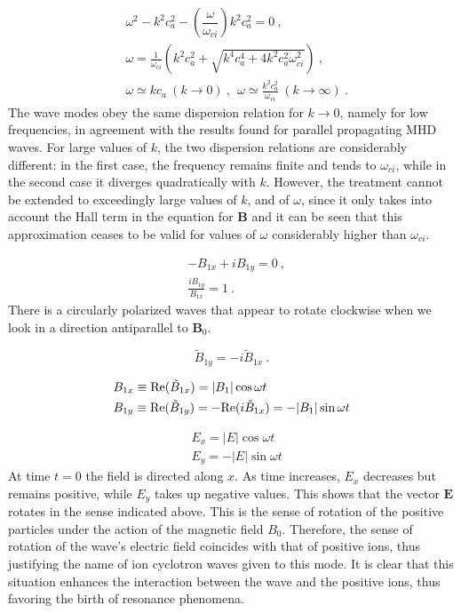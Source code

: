 \documentclass[12pt,a4paper]{article}
\renewcommand{\vec}[1]{\boldsymbol{#1}}
\begin{document}
\begin{align*}
& \omega^2 -k^2 c_a^2 - \left(\dfrac{\omega}{\omega_{ci} } \right) k^2 c_a^2 = 0 ~, \\
& \omega = \frac{1}{\omega_{ci} } \left(k^2 c_a^2 +\sqrt{k^4 c_a^4 +4k^2 c_a^2 \omega_{ci}^2 } \right) ~,\\
& \omega \simeq k c_a ~(k \rightarrow 0) ~, ~~ \omega \simeq \frac{k^2 c_a^2}{\omega_{ci}} ~(k \rightarrow \infty) ~.
\end{align*}
The wave modes obey the same dispersion relation for $k \rightarrow 0$, namely for low frequencies, in agreement with the results found for parallel propagating MHD waves. For large values of $k$, the two dispersion relations are considerably different: in the first case, the frequency remains finite and tends to $\omega_{ci}$, while in the second case it diverges quadratically with $k$. However, the treatment cannot be extended to exceedingly large values of $k$, and of $\omega$, since it only takes into account the Hall term in the equation for $\vec{B}$ and it can be seen that this approximation ceases to be valid for values of $\omega$ considerably higher than $\omega_{ci}$.

\begin{align*}
& -B_{1x} +iB_{1y} = 0 ~, \\
& \frac{i B_{1y}}{B_{1x} } = 1 ~.
\end{align*}
There is a circularly polarized waves that appear to rotate clockwise when we look in a direction antiparallel to  $\vec{B}_0$. 


\begin{equation*}
\tilde{B}_{1y} = -i\tilde{B}_{1x} ~.
\end{equation*}

\begin{align*}
& B_{1x} \equiv {\rm Re}(\tilde{B}_{1x}) = |B_1| \cos \omega t \\
& B_{1y} \equiv {\rm Re}(\tilde{B}_{1y}) = -{\rm Re}(i \tilde{B}_{1x}) = -|B_1| \sin \omega t
\end{align*}

\begin{align*}
& E_x = |E| \cos \omega t \\
& E_y = -|E| \sin \omega t
\end{align*}
At time $t = 0$ the field is directed along $x$. As time increases, $E_x$ decreases but remains positive, while $E_y$ takes up negative values. This shows that the vector $\vec{E}$ rotates in the sense indicated above. This is the sense of rotation of the positive particles under the action of the magnetic field $B_0$. Therefore, the sense of rotation of the wave's electric field coincides with that of positive ions, thus justifying the name of ion cyclotron waves given to this mode. It is clear that this situation enhances the interaction between the wave and the positive ions, thus favoring the birth of resonance phenomena.
\end{document}

